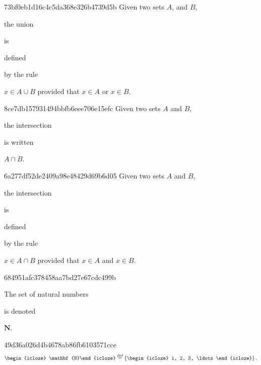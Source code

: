 \begin{note}{73bf0eb1d16c4c5da368e326b4739d5b}
    Given two sets \({ A }\), and \({ B }\), \begin{icloze}{2}the union\end{icloze} is \begin{icloze}{3}defined\end{icloze} by the rule
    \begin{center}
        \begin{icloze}{1}
            \({ x \in A \cup B }\) provided that \({ x \in A }\) or \({ x \in B }\).
        \end{icloze}
    \end{center}
\end{note}

\begin{note}{8ce7db157931494bbfb6eee706e15efc}
    Given two sets \({ A }\) and \({ B }\), \begin{icloze}{1}the intersection\end{icloze} is written \begin{icloze}{2}\({ A \cap B }\).\end{icloze}
\end{note}

\begin{note}{6a277df52de2409a98e48429d69b6d05}
    Given two sets \({ A }\) and \({ B }\), \begin{icloze}{2}the intersection\end{icloze} is \begin{icloze}{3}defined\end{icloze} by the rule
    \begin{center}
        \begin{icloze}{1}
            \({ x \in A \cap B }\) provided that \({ x \in A }\) and \({ x \in B }\).
        \end{icloze}
    \end{center}
\end{note}

\begin{note}{684951afc378458aa7bd27e67cdc499b}
    \begin{icloze}{2}The set of natural numbers\end{icloze} is denoted \begin{icloze}{1}\({ \mathbf{N} }\).\end{icloze}
\end{note}

\begin{note}{49d36a026d4b4678ab86fb6103571cce}
    \[
        \begin{icloze}{2}\mathbf{N}\end{icloze} \overset{\text{def}}= \left\{ \begin{icloze}{1}1, 2, 3, \ldots\end{icloze} \right\}.
    \]
\end{note}

